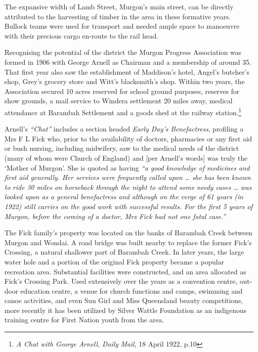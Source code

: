 \smallskip


The expansive width of Lamb Street, Murgon's main street, can be directly attributed to the harvesting of timber in the area in these formative years. Bullock teams were used for transport and needed ample space to manoeuvre with their precious cargo en-route to the rail head.



Recognising the potential of the district the Murgon Progress Association was formed in 1906 with George Arnell as Chairman and a membership of around 35. That first year also saw the establishment of Maddison's hotel, Angel's butcher's shop, Grey's grocery store and Witt's blacksmith's shop. Within two years, the Association secured 10 acres reserved for school ground purposes, reserves for show grounds, a mail service to Windera settlement 20 miles away, medical attendance at Barambah Settlement and a goods shed at the railway station.\footnote{\emph{A Chat with George Arnell, Daily Mail,} 18 April 1922, p.10}


Arnell's \emph{``Chat''} includes a section headed \emph{Early Day's Benefactress}, profiling a Mrs F L Fick who, prior to the availability of doctors, pharmacies or any first aid or bush nursing, including midwifery, saw to the medical needs of the district (many of whom were Church of England) and {[}per Arnell's words{]} was truly the `Mother of Murgon'. She is quoted as having \emph{``a good knowledge of medicines and first aid generally. Her services were frequently called upon \ldots{} she has been known to ride 30 miles on horseback through the night to attend some needy cases \ldots{} was looked upon as a general benefactress and although on the verge of 61 years (in 1922) still carries on the good work with successful results. For the first 5 years of Murgon, before the coming of a doctor, Mrs Fick had not one fatal case.''}



The Fick family's property was located on the banks of Barambah Creek between Murgon and Wondai. A road bridge was built nearby to replace the former Fick's Crossing\emph{,} a natural shallower part of Barambah Creek. In later years, the large water hole and a portion of the original Fick property became a popular recreation area. Substantial facilities were constructed, and an area allocated as Fick's Crossing Park\emph{.} Used extensively over the years as a convention centre, out-door education centre, a venue for church functions and camps, swimming and canoe activities, and even Sun Girl and Miss Queensland beauty competitions, more recently it has been utilized by Silver Wattle Foundation as an indigenous training centre for First Nation youth from the area.



